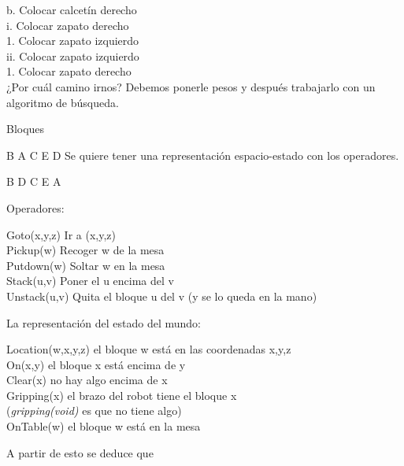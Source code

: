 b. Colocar calcetín derecho\\
i. Colocar zapato derecho\\
1. Colocar zapato izquierdo\\
ii. Colocar zapato izquierdo\\

1. Colocar zapato derecho\\


¿Por cuál camino irnos?
Debemos ponerle pesos y después trabajarlo con un algoritmo de búsqueda.


\begin{ejemplo}
	Bloques
	
	B	A	C	E	D
	Se quiere tener una representación espacio-estado con los operadores.
	
	B	D	C 	E	A
	
	
\end{ejemplo}

Operadores:


Goto(x,y,z) \hspace{0.5cm} Ir a (x,y,z) \\
Pickup(w) \hspace{0.5cm}Recoger w de la mesa \\
Putdown(w) \hspace{0.5cm}Soltar w en la mesa \\
Stack(u,v) \hspace{0.5cm}Poner el u encima del v \\
Unstack(u,v) \hspace{0.5cm} Quita el bloque u del v (y se lo queda en la mano)


La representación del estado del mundo:


Location(w,x,y,z) \hspace{0.5cm}  el bloque w está en las  coordenadas x,y,z \\
On(x,y) \hspace{0.5cm} el bloque x está encima de y \\
Clear(x) \hspace{0.5cm} no hay algo encima de x \\
Gripping(x) \hspace{0.5cm} el brazo del robot tiene el bloque x \\ (\textit{gripping(void)} es que no tiene algo) \\
OnTable(w) \hspace{0.5cm} el bloque w está en la mesa


A partir de esto se deduce que

